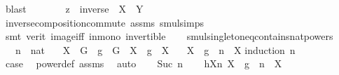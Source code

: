 \begin{isabellebody}
\ blast\isanewline
\ \ \ \ \isamarkupfalse%
\ \isamarkupfalse%
\ {\isachardoublequoteopen}z\ {\isasymin}\ inverse\ {\isacharbackquote}{\kern0pt}\ {\isacharparenleft}{\kern0pt}X\ {\isasymcdots}\ Y{\isacharparenright}{\kern0pt}{\isachardoublequoteclose}\ \isamarkupfalse%
\ inverse{\isacharunderscore}{\kern0pt}composition{\isacharunderscore}{\kern0pt}commute\ assms\ smul{\isachardot}{\kern0pt}simps\isanewline
\ \ \ \ \ \ \isamarkupfalse%
\ {\isacharparenleft}{\kern0pt}smt\ {\isacharparenleft}{\kern0pt}verit{\isacharparenright}{\kern0pt}\ image{\isacharunderscore}{\kern0pt}iff\ in{\isacharunderscore}{\kern0pt}mono\ invertible{\isacharparenright}{\kern0pt}\isanewline
\ \ \isamarkupfalse%
\isanewline
{}\isamarkupfalse%
%
\endisatagproof
{\isafoldproof}%
%
\isadelimproof
\isanewline
%
\endisadelimproof
\isanewline
{}\isamarkupfalse%
\ smul{\isacharunderscore}{\kern0pt}singleton{\isacharunderscore}{\kern0pt}eq{\isacharunderscore}{\kern0pt}contains{\isacharunderscore}{\kern0pt}nat{\isacharunderscore}{\kern0pt}powers{\isacharcolon}{\kern0pt}\isanewline
\ \ \ n\ {\isacharcolon}{\kern0pt}{\isacharcolon}{\kern0pt}\ nat\isanewline
\ \ \ {\isachardoublequoteopen}X\ {\isasymsubseteq}\ G{\isachardoublequoteclose}\ \ {\isachardoublequoteopen}g\ {\isasymin}\ G{\isachardoublequoteclose}\ \ {\isachardoublequoteopen}X\ {\isasymcdots}\ {\isacharbraceleft}{\kern0pt}g{\isacharbraceright}{\kern0pt}\ {\isacharequal}{\kern0pt}\ X{\isachardoublequoteclose}\isanewline
\ \ \ {\isachardoublequoteopen}X\ {\isasymcdots}\ {\isacharbraceleft}{\kern0pt}g\ {\isacharcircum}{\kern0pt}\ n{\isacharbraceright}{\kern0pt}\ {\isacharequal}{\kern0pt}\ X{\isachardoublequoteclose}\isanewline
%
\isadelimproof
%
\endisadelimproof
%
\isatagproof
{}\isamarkupfalse%
{\isacharparenleft}{\kern0pt}induction\ n{\isacharparenright}{\kern0pt}\isanewline
\ \ \isamarkupfalse%
\ {}\isanewline
\ \ \isamarkupfalse%
\ \isamarkupfalse%
\ {\isacharquery}{\kern0pt}case\ \isamarkupfalse%
\ power{\isacharunderscore}{\kern0pt}def\ assms\ \isamarkupfalse%
\ auto\isanewline
{}\isamarkupfalse%
\isanewline
\ \ \isamarkupfalse%
\ {\isacharparenleft}{\kern0pt}Suc\ n{\isacharparenright}{\kern0pt}\isanewline
\ \ \isamarkupfalse%
\ hXn{\isacharcolon}{\kern0pt}\ {\isachardoublequoteopen}X\ {\isasymcdots}\ {\isacharbraceleft}{\kern0pt}g\ {\isacharcircum}{\kern0pt}\ n{\isacharbraceright}{\kern0pt}\ {\isacharequal}{\kern0pt}\ X{\isachardoublequoteclose}\isanewline

\end{isabellebody}

